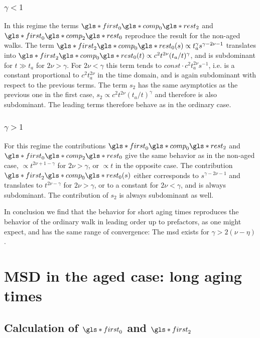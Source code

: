 \subsubsection{$\gamma<1$}
In this regime the terms $\gls*{first}_0\gls*{comp}_0 \gls*{rest}_2 $ and $ \gls*{first}_0\gls*{comp}_2 \gls*{rest}_0$ reproduce the result for the non-aged walks. The term $\gls*{first}_2\gls*{comp}_0 \gls*{rest}_0 (s)  \propto t_a^\gamma s^{\gamma-2\nu -1}$
translates into $\gls*{first}_2\gls*{comp}_0 \gls*{rest}_0 (t) \propto c^2 t^{2\nu}(t_a/t)^\gamma$, and is subdominant for $t \gg t_a$ for $2\nu > \gamma$. For $2\nu < \gamma$ this term tends to $const \cdot  c^2 t_a^{2\nu}s^{-1}$, i.e. is a constant proportional to $c^2 t_a^{2\nu}$ in the time domain, and is again subdominant with respect to the previous terms.
The term $s_2$ has the same asymptotics as the previous one in the first case, $s_2 \propto c^2 t^{2\nu}(t_a/t)^\gamma$ and therefore is also subdominant. The leading terms  therefore behave as in the ordinary case.

\subsubsection{$\gamma>1$}
For this regime the contributions $\gls*{first}_0\gls*{comp}_0 \gls*{rest}_2 $ and $\gls*{first}_0\gls*{comp}_2 \gls*{rest}_0 $ give the same behavior as in the non-aged case, $\propto t^{2\nu +1- \gamma }$ for $2\nu > \gamma$,
or  $\propto t$ in the opposite case. The contribution $\gls*{first}_2\gls*{comp}_0 \gls*{rest}_0 (s)$ either corresponds to $s^{\gamma-2\nu -1}$ and translates to $t^{2\nu - \gamma}$ for $2\nu > \gamma$, or to a constant for $2\nu < \gamma$, and is always subdominant. The contribution of $s_2$ is always subdominant as well. 

In conclusion we find that the behavior for short aging times reproduces the behavior of the ordinary walk in leading order up to prefactors, as one might expect, and has the same range of convergence: The \gls*{msd} exists for $\gamma > 2(\nu-\eta)$.


\section{MSD in the aged case: long aging times }
\label{sec:considerably}

\subsection*{Calculation of $\gls*{first}_0$ and $\gls*{first}_2$}

